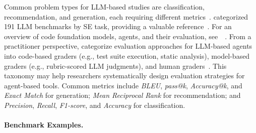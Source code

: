 \documentclass[smallextended]{svjour3}
\newcommand{\guidelineparagraph}[1]{\paragraph{#1.}}
\newcommand{\guidelineparagraph}[1]{\paragraph{#1}}
\begin{document}
Common problem types for LLM-based studies are classification, recommendation, and generation, each requiring different metrics~\cite{DBLP:journals/tosem/HouZLYWLLLGW24}. \citeauthor{DBLP:journals/corr/abs-2505-08903} categorized 191 LLM benchmarks by SE task, providing a valuable reference~\cite{DBLP:journals/corr/abs-2505-08903}. For an overview of code foundation models, agents, and their evaluation, see~\citeauthor{yang2025code}~\cite{yang2025code}. From a practitioner perspective, \citeauthor{Anthropic2025evals} categorize evaluation approaches for LLM-based agents into code-based graders (e.g., test suite execution, static analysis), model-based graders (e.g., rubric-scored LLM judgments), and human graders~\cite{Anthropic2025evals}. This taxonomy may help researchers systematically design evaluation strategies for agent-based tools. Common metrics include \emph{BLEU}, \emph{pass@k}, \emph{Accuracy@k}, and \emph{Exact Match} for generation; \emph{Mean Reciprocal Rank} for recommendation; and \emph{Precision}, \emph{Recall}, \emph{F1-score}, and \emph{Accuracy} for classification.

\guidelineparagraph{Benchmark Examples}
\end{document}
